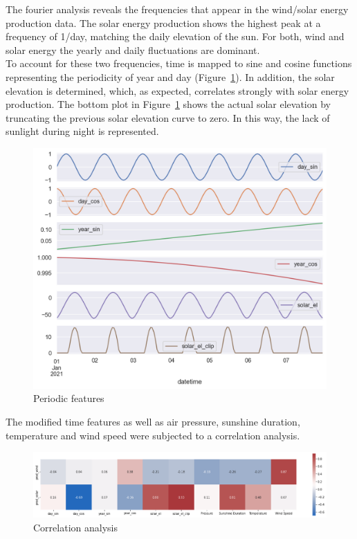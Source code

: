 \documentclass[11pt,table]{article}
\begin{document}
The fourier analysis reveals the frequencies that appear in the wind/solar energy production data. The solar energy production shows the highest peak at a frequency of 1/day, matching the daily elevation of the sun. For both, wind and solar energy the yearly and daily fluctuations are dominant.\\
To account for these two frequencies, time is mapped to sine and cosine functions representing the periodicity of year and day (Figure~\ref{fig:timeSignal}). In addition, the solar elevation is determined, which, as expected, correlates strongly with solar energy production. The bottom plot in Figure~\ref{fig:timeSignal} shows the actual solar elevation by truncating the previous solar elevation curve to zero. In this way, the lack of sunlight during night is represented.

\begin{figure}[H]
	\centering
	\includegraphics[scale=0.7]{Figures/timeSignal.png}
	\caption{Periodic features}
	\label{fig:timeSignal}
\end{figure}

The modified time features as well as air pressure, sunshine duration, temperature and wind speed were subjected to a correlation analysis. 

\begin{figure}[H]
	\centering
	\includegraphics[scale=1]{Figures/correlation.png}
	\caption{Correlation analysis}
	\label{fig:correlation}
\end{figure}
\end{document}
